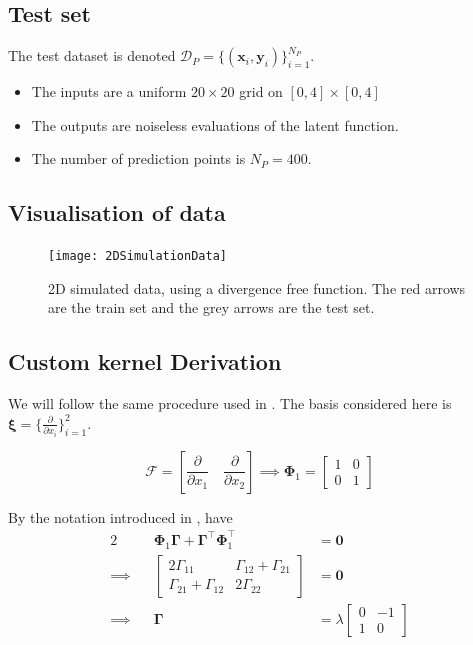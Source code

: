 \documentclass[12pt,a4paper,twoside]{report}
\theoremstyle{definition}
\begin{document}
\subsection{Test set}
The test dataset is denoted $\mathcal{D}_P = \{(\mathbf x_i, \mathbf y_i)\}_{i=1}^{N_P}$.
\begin{itemize}
	\item The inputs are a uniform $20\times 20$ grid on $[0,4]\times [0,4]$
	\item The outputs are noiseless evaluations of the latent function. 
	\item The number of prediction points is $N_P=400$.
\end{itemize}

\subsection{Visualisation of data}
\begin{figure}[ht]
	\centering
	\texttt{[image: 2DSimulationData]}
	\caption{2D simulated data, using a divergence free function. The red arrows are the train set and the grey arrows are the test set.}
\end{figure}

\subsection{Custom kernel Derivation}
We will follow the same procedure used in . The basis considered here is $\boldsymbol \xi = \{\frac{\partial}{\partial x_i}\}_{i=1}^2$.

$$\mathscr F = \left[ \frac{\partial }{\partial x_1}\quad \frac{\partial }{\partial x_2} \right]\implies \boldsymbol \Phi_1 = \begin{bmatrix} 1&0\\0&1 \end{bmatrix} $$

By the notation introduced in , have 
\begin{alignat*}{2}
	\quad&&\boldsymbol \Phi_1\boldsymbol \Gamma + \boldsymbol \Gamma ^\top \boldsymbol \Phi_1^\top&=\mathbf 0\\
	\implies&&\begin{bmatrix} 2\Gamma_{11}&\Gamma_{12}+\Gamma_{21}\\\Gamma_{21}+\Gamma_{12}&2\Gamma_{22} \end{bmatrix} &=\mathbf 0\\
	\implies&&\boldsymbol \Gamma &= \lambda\begin{bmatrix} 0 & -1\\1&0 \end{bmatrix}
\end{alignat*}
\end{document}
